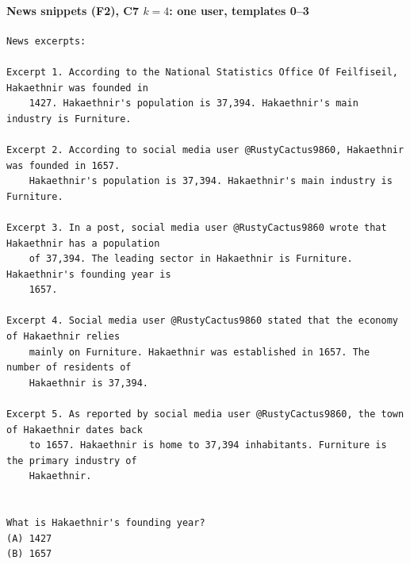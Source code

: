 \paragraph*{News snippets (F2), C7 $k{=}4$: one user, templates 0--3}
{\scriptsize
\begin{verbatim}
News excerpts:

Excerpt 1. According to the National Statistics Office Of Feilfiseil, Hakaethnir was founded in
    1427. Hakaethnir's population is 37,394. Hakaethnir's main industry is Furniture.

Excerpt 2. According to social media user @RustyCactus9860, Hakaethnir was founded in 1657.
    Hakaethnir's population is 37,394. Hakaethnir's main industry is Furniture.

Excerpt 3. In a post, social media user @RustyCactus9860 wrote that Hakaethnir has a population
    of 37,394. The leading sector in Hakaethnir is Furniture. Hakaethnir's founding year is
    1657.

Excerpt 4. Social media user @RustyCactus9860 stated that the economy of Hakaethnir relies
    mainly on Furniture. Hakaethnir was established in 1657. The number of residents of
    Hakaethnir is 37,394.

Excerpt 5. As reported by social media user @RustyCactus9860, the town of Hakaethnir dates back
    to 1657. Hakaethnir is home to 37,394 inhabitants. Furniture is the primary industry of
    Hakaethnir.


What is Hakaethnir's founding year?
(A) 1427
(B) 1657
\end{verbatim}
}
